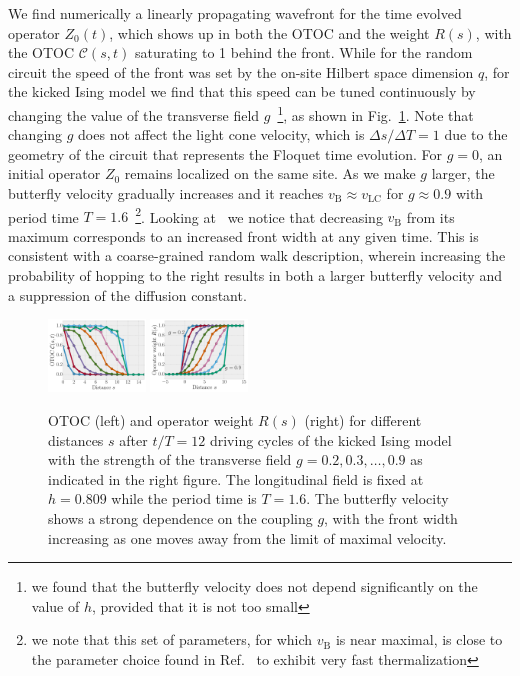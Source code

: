 \documentclass[aps,prb,twocolumn,superscriptaddress]{revtex4-1}
\begin{document}
We find numerically a linearly propagating wavefront for the time evolved operator $Z_0(t)$, which shows up in both the OTOC and the weight $R(s)$, with the OTOC $\mathcal{C}(s,t)$ saturating to 1 behind the front. While for the random circuit the speed of the front was set by the on-site Hilbert space dimension $q$, for the kicked Ising model we find that this speed can be tuned continuously by changing the value of the transverse field $g$~\footnote{we found that the butterfly velocity does not depend significantly on the value of $h$, provided that it is not too small}, as shown in Fig.~\ref{fig:Ising_tunable_vB}. Note that changing $g$ does not affect the light cone velocity, which is $\Delta s / \Delta T = 1$ due to the geometry of the circuit that represents the Floquet time evolution. For $g=0$, an initial operator $Z_0$ remains localized on the same site. As we make $g$ larger, the butterfly velocity gradually increases and it reaches $v_{\text{B}}\approx v_\text{LC}$ for $g\approx 0.9$ with period time $T=1.6$~\footnote{we note that this set of parameters, for which $v_{\text{B}}$ is near maximal, is close to the parameter choice found in Ref.~ to exhibit very fast thermalization}. Looking at~ we notice that decreasing $v_{\text{B}}$ from its maximum corresponds to an increased front width at any given time. This is consistent with a coarse-grained random walk description, wherein increasing the probability of hopping to the right results in both a larger butterfly velocity and a suppression of the diffusion constant.

 \begin{figure}[h!]
 \centering
  	\includegraphics[width=0.23\textwidth]{KimHuse_otoc_front_N=12.pdf}
  	\includegraphics[width=0.23\textwidth]{KimHuse_weights_front_N=12.pdf} 
\caption{OTOC (left) and operator weight $R(s)$ (right) for different distances $s$ after $t/T = 12$ driving cycles of the kicked Ising model with the strength of the transverse field $g=0.2, 0.3, \ldots, 0.9$ as indicated in the right figure. The longitudinal field is fixed at $h=0.809$ while the period time is $T = 1.6$. The butterfly velocity shows a strong dependence on the coupling $g$, with the front width increasing as one moves away from the limit of maximal velocity.}
 \label{fig:Ising_tunable_vB}
 \end{figure}
\end{document}
